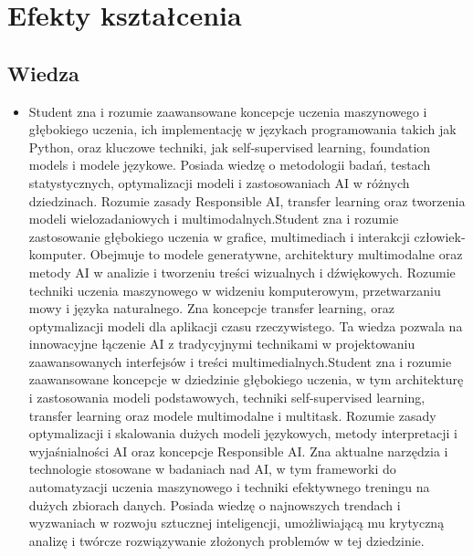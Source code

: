 \documentclass[12pt, a4paper]{article}
\begin{document}
\section{Efekty kształcenia}

\subsection*{Wiedza}
\begin{itemize}
  \item Student zna i rozumie zaawansowane koncepcje uczenia maszynowego i głębokiego uczenia, ich implementację w językach programowania takich jak Python, oraz kluczowe techniki, jak self-supervised learning, foundation models i modele językowe. Posiada wiedzę o metodologii badań, testach statystycznych, optymalizacji modeli i zastosowaniach AI w różnych dziedzinach. Rozumie zasady Responsible AI, transfer learning oraz tworzenia modeli wielozadaniowych i multimodalnych.Student zna i rozumie zastosowanie głębokiego uczenia w grafice, multimediach i interakcji człowiek-komputer. Obejmuje to modele generatywne, architektury multimodalne oraz metody AI w analizie i tworzeniu treści wizualnych i dźwiękowych. Rozumie techniki uczenia maszynowego w widzeniu komputerowym, przetwarzaniu mowy i języka naturalnego. Zna koncepcje transfer learning, oraz optymalizacji modeli dla aplikacji czasu rzeczywistego. Ta wiedza pozwala na innowacyjne łączenie AI z tradycyjnymi technikami w projektowaniu zaawansowanych interfejsów i treści multimedialnych.Student zna i rozumie zaawansowane koncepcje w dziedzinie głębokiego uczenia, w tym architekturę i zastosowania modeli podstawowych, techniki self-supervised learning, transfer learning oraz modele multimodalne i multitask. Rozumie zasady optymalizacji i skalowania dużych modeli językowych, metody interpretacji i wyjaśnialności AI oraz koncepcje Responsible AI. Zna aktualne narzędzia i technologie stosowane w badaniach nad AI, w tym frameworki do automatyzacji uczenia maszynowego i techniki efektywnego treningu na dużych zbiorach danych. Posiada wiedzę o najnowszych trendach i wyzwaniach w rozwoju sztucznej inteligencji, umożliwiającą mu krytyczną analizę i twórcze rozwiązywanie złożonych problemów w tej dziedzinie.
\end{itemize}
\end{document}
